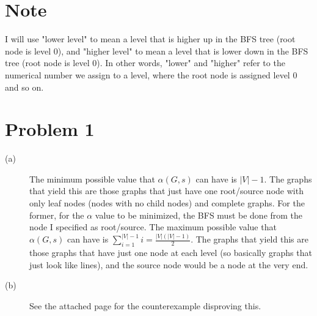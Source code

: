 \documentclass{article}
\begin{document}
\section*{Note}
I will use "lower level" to mean a level that is higher up in the BFS tree
(root node is level 0), and "higher level" to mean a level that is lower down in
the BFS tree (root node is level 0). In other words, "lower" and "higher"
refer to the numerical number we assign to a level, where the root
node is assigned level 0 and so on.
\section*{Problem 1}
\begin{description}
    \item[(a)] The minimum possible value that $\alpha(G,s)$ can have is
        $|V| - 1$. The graphs that yield this are those graphs that just have
        one root/source node with only leaf nodes
        (nodes with no child nodes) and complete graphs. For the former,
        for the $\alpha$ value to be minimized, the BFS must be done from the
        node I specified as root/source.
        The maximum possible value that $\alpha(G,s)$ can have is
        $\sum_{i=1}^{|V|-1} i = \frac{|V|(|V|-1)}{2}$.
        The graphs that yield this are those graphs
        that have just one node at each level (so basically graphs that
        just look like lines), and the source node would be a node at the
        very end.
    \item[(b)] See the attached page for the counterexample disproving this.
\end{description}

\end{document}
